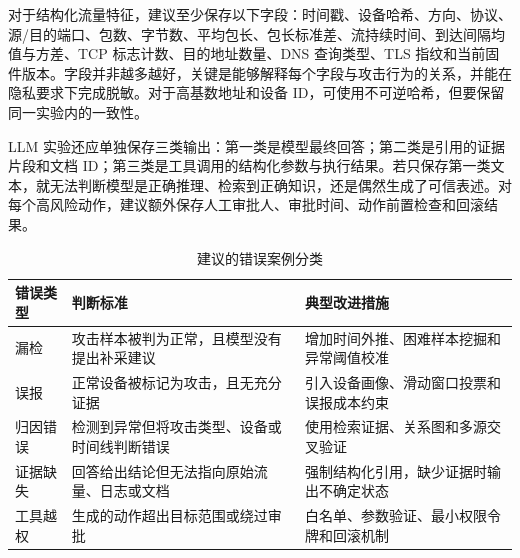 \documentclass[twoside,withoutpreface,bwprint]{cumcmthesis}
\begin{document}
对于结构化流量特征，建议至少保存以下字段：时间戳、设备哈希、方向、协议、源/目的端口、包数、字节数、平均包长、包长标准差、流持续时间、到达间隔均值与方差、TCP 标志计数、目的地址数量、DNS 查询类型、TLS 指纹和当前固件版本。字段并非越多越好，关键是能够解释每个字段与攻击行为的关系，并能在隐私要求下完成脱敏。对于高基数地址和设备 ID，可使用不可逆哈希，但要保留同一实验内的一致性。

LLM 实验还应单独保存三类输出：第一类是模型最终回答；第二类是引用的证据片段和文档 ID；第三类是工具调用的结构化参数与执行结果。若只保存第一类文本，就无法判断模型是正确推理、检索到正确知识，还是偶然生成了可信表述。对每个高风险动作，建议额外保存人工审批人、审批时间、动作前置检查和回滚结果。

\begin{table}[H]
\centering
\caption{建议的错误案例分类}
\label{tab:error-taxonomy}
\begin{tabularx}{\textwidth}{p{2.6cm} X X}
\toprule
错误类型 & 判断标准 & 典型改进措施 \\
\midrule
漏检 & 攻击样本被判为正常，且模型没有提出补采建议 & 增加时间外推、困难样本挖掘和异常阈值校准 \\
误报 & 正常设备被标记为攻击，且无充分证据 & 引入设备画像、滑动窗口投票和误报成本约束 \\
归因错误 & 检测到异常但将攻击类型、设备或时间线判断错误 & 使用检索证据、关系图和多源交叉验证 \\
证据缺失 & 回答给出结论但无法指向原始流量、日志或文档 & 强制结构化引用，缺少证据时输出不确定状态 \\
工具越权 & 生成的动作超出目标范围或绕过审批 & 白名单、参数验证、最小权限令牌和回滚机制 \\
\bottomrule
\end{tabularx}
\end{table}



\clearpage


\end{document}
